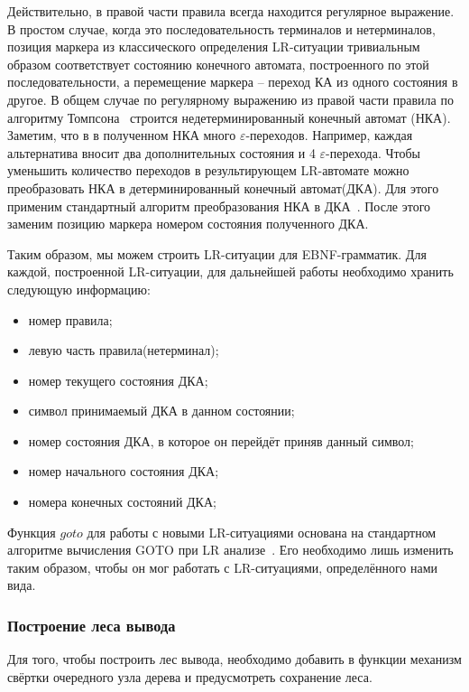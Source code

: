 Действительно, в правой части правила всегда находится регулярное выражение. В простом случае, когда это последовательность терминалов и нетерминалов, позиция маркера из классического определения LR-ситуации тривиальным образом соответствует состоянию конечного автомата, построенного по этой последовательности, а перемещение маркера -- переход КА из одного состояния в другое. В общем случае по  регулярному выражению из правой части правила по алгоритму Томпсона~\cite{DrgBook} строится недетерминированный конечный автомат (НКА). Заметим, что в в полученном НКА много $\varepsilon$-переходов. Например, каждая альтернатива вносит два дополнительных состояния и 4 $\varepsilon$-перехода. Чтобы уменьшить количество переходов в результирующем LR-автомате можно преобразовать НКА в детерминированный конечный автомат(ДКА). Для этого применим стандартный алгоритм преобразования НКА в ДКА~\cite{DrgBook}. После этого заменим позицию маркера номером состояния полученного ДКА.
 
Таким образом, мы можем строить LR-ситуации для EBNF-грамматик. Для каждой, построенной LR-ситуации, для дальнейшей работы необходимо хранить следующую информацию:
\begin{itemize}
  \item номер правила;
  \item левую часть правила(нетерминал);
  \item номер текущего состояния ДКА;
  \item символ принимаемый ДКА в данном состоянии;
  \item номер состояния ДКА, в которое он перейдёт приняв данный символ;
  \item номер начального состояния ДКА;
  \item номера конечных состояний ДКА;
\end{itemize}

Функция $goto$ для работы с новыми LR-ситуациями основана на стандартном алгоритме вычисления GOTO при LR анализе~\cite{DrgBook}. Его необходимо лишь изменить таким образом, чтобы он мог работать с LR-ситуациями, определённого нами вида. 

\subsubsection{Построение леса вывода}

Для того, чтобы построить лес вывода, необходимо добавить в функции механизм свёртки очередного узла дерева и предусмотреть сохранение леса.

